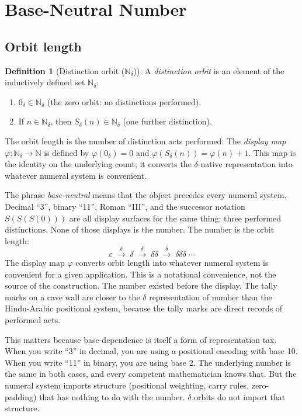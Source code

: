 \documentclass[11pt,a4paper]{article}
\theoremstyle{definition}
\newtheorem{definition}[theorem]{Definition}
\theoremstyle{remark}
\begin{document}
\section{Base-Neutral Number}\label{sec:number}

\subsection{Orbit length}

\begin{definition}[Distinction orbit ($\mathbb{N}_\delta$)]\label{def:orbit}
A \emph{distinction orbit} is an element of the inductively defined set
$\mathbb{N}_\delta$:
\begin{enumerate}[leftmargin=2em, label=(\roman*)]
  \item $0_\delta \in \mathbb{N}_\delta$ \quad (the zero orbit: no
    distinctions performed).
  \item If $n \in \mathbb{N}_\delta$, then $S_\delta(n) \in
    \mathbb{N}_\delta$ \quad (one further distinction).
\end{enumerate}
The orbit length is the number of distinction acts performed. The
\emph{display map} $\varphi : \mathbb{N}_\delta \to \mathbb{N}$ is defined by
$\varphi(0_\delta) = 0$ and $\varphi(S_\delta(n)) = \varphi(n) + 1$. This map
is the identity on the underlying count; it converts the $\delta$-native
representation into whatever numeral system is convenient.
\end{definition}

The phrase \emph{base-neutral} means that the object precedes every numeral
system. Decimal ``3'', binary ``11'', Roman ``III'', and the successor
notation $S(S(S(0)))$ are all display surfaces for the same thing: three
performed distinctions. None of those displays is the number. The number is
the orbit length:
\[
  \varepsilon \;\xrightarrow{\;\delta\;}\;
  \delta \;\xrightarrow{\;\delta\;}\;
  \delta\delta \;\xrightarrow{\;\delta\;}\;
  \delta\delta\delta \;\cdots
\]
The display map $\varphi$ converts orbit length into whatever numeral system
is convenient for a given application. This is a notational convenience, not
the source of the construction. The number existed before the display. The
tally marks on a cave wall are closer to the $\delta$ representation of number
than the Hindu-Arabic positional system, because the tally marks are direct
records of performed acts.

This matters because base-dependence is itself a form of representation tax.
When you write ``3'' in decimal, you are using a positional encoding with base
10. When you write ``11'' in binary, you are using base 2. The underlying
number is the same in both cases, and every competent mathematician knows
that. But the numeral system imports structure (positional weighting, carry
rules, zero-padding) that has nothing to do with the number. $\delta$ orbits
do not import that structure.
\end{document}
